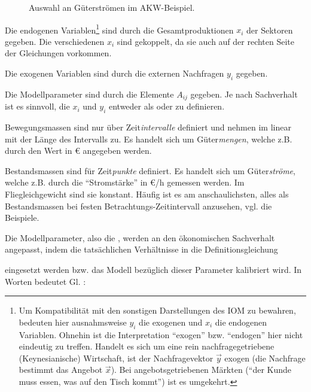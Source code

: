 \begin{figure}
\caption{\label{fig:AKWflussdiag}Auswahl an G\"uterstr\"omen
 im AKW-Beispiel.}
\end{figure}


\bi
\item Die endogenen Variablen\footnote{Um Kompatibilit\"at mit den
sonstigen Darstellungen des IOM 
zu bewahren, bedeuten hier ausnahmsweise $y_i$
die exogenen und $x_i$ die endogenen Variablen. Ohnehin ist die
Interpretation ``exogen'' bzw. ``endogen'' hier nicht eindeutig zu
treffen. Handelt es sich um eine rein nachfragegetriebene
(Keynesianische) Wirtschaft, ist der Nachfragevektor $\vec{y}$ exogen (die Nachfrage bestimmt
das Angebot $\vec{x}$). Bei angebotsgetriebenen M\"arkten (``der Kunde
muss essen, was auf den Tisch kommt'') ist es umgekehrt.}
sind durch die Gesamtproduktionen $x_i$
der Sektoren gegeben. Die verschiedenen $x_i$ sind gekoppelt, da
 sie auch auf der rechten Seite der Gleichungen vorkommen.
\item Die exogenen Variablen sind durch die externen Nachfragen $y_i$
 gegeben.
\item Die Modellparameter sind durch die Elemente $A_{ij}$ 
gegeben. 
\ei
Je nach Sachverhalt ist es sinnvoll, die $x_i$ und $y_i$ entweder als
 oder  zu definieren.
\bi
\item Bewegungsmassen sind nur \"uber Zeit\emph{intervalle} definiert und
nehmen im  linear mit der L\"ange des
Intervalls zu. Es handelt sich um G\"uter\-\emph{men\-gen}, welche
z.B. durch den Wert in \euro{} angegeben werden.
\item Bestandsmassen sind f\"ur Zeit\emph{punkte} definiert. Es handelt sich um G\"uter\emph{str\"ome}, welche
z.B. durch die ``Stromst\"arke'' in \euro{}/h gemessen werden. Im
Flie\3gleichgewicht sind sie konstant.
\ei
H\"aufig ist es am anschaulichsten, alles als Bestandsmassen bei
festen Betrachtungs-Zeitintervall anzusehen, vgl. die Beispiele.

Die Modellparameter, also die , werden an den \"okonomischen Sachverhalt
angepasst,
 indem die tats\"achlichen Verh\"altnisse in die
Definitionsgleichung

%
eingesetzt werden bzw. das Modell bez\"uglich dieser Parameter
kalibriert wird. In Worten bedeutet Gl. :



